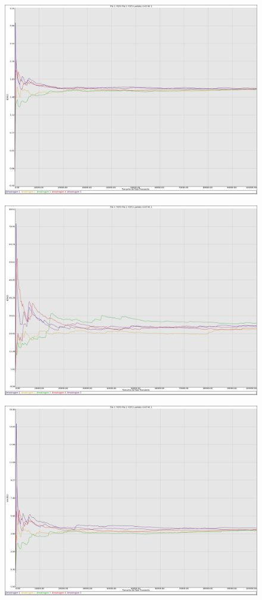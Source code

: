 \documentclass[a4paper,10pt]{article}
\begin{document}
\begin{figure}
\includegraphics[scale = 0.2]{./graficos_transiente_1/FCFS/07.png}
\end{figure}
\begin{figure}
\includegraphics[scale = 0.2]{./graficos_transiente_1/FCFS/08.png}
\end{figure}
\begin{figure}
\includegraphics[scale = 0.2]{./graficos_transiente_1/FCFS/09.png}
\end{figure}
\end{document}
